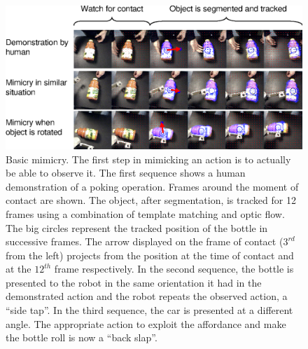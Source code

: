 \begin{figure}[tbh]
\begin{center}
\includegraphics[width=\textwidth]{fig-mimicry-bottle}
\caption{ 
\label{fig:observed-action}
%
Basic mimicry.  The first step in mimicking an action is to actually
be able to observe it.  The first sequence shows a human demonstration
of a poking operation.  Frames around the moment of contact are shown.
The object, after segmentation, is tracked for 12 frames using a
combination of template matching and optic flow.  The big circles
represent the tracked position of the bottle in successive frames.
The arrow displayed on the frame of contact ($3^{rd}$ from the left)
projects from the position at the time of contact and at the $12^{th}$
frame respectively.
%
In the second sequence, the bottle is presented to the robot in the
same orientation it had in the demonstrated action and the robot
repeats the observed action, a ``side tap''.  In the third sequence,
the car is presented at a different angle.  The appropriate action to
exploit the affordance and make the bottle roll is now a ``back
slap''.
%
%
}
\end{center}
\end{figure}

